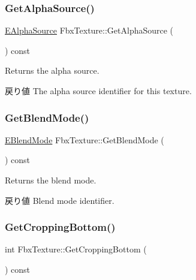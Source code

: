 \mbox{\label{class_fbx_texture_a6ca527821cb9e95af5376e7bb2979deb}} 
\subsubsection{\texorpdfstring{Get\+Alpha\+Source()}{GetAlphaSource()}}
{\footnotesize\ttfamily \hyperlink{class_fbx_texture_a12777ea406718d186e21b9656716171d}{E\+Alpha\+Source} Fbx\+Texture\+::\+Get\+Alpha\+Source (\begin{DoxyParamCaption}{ }\end{DoxyParamCaption}) const}

Returns the alpha source. \begin{DoxyReturn}{戻り値}
The alpha source identifier for this texture. 
\end{DoxyReturn}
\mbox{\label{class_fbx_texture_ad9f85f7fe1bb43f263f2edddeb9df443}} 
\subsubsection{\texorpdfstring{Get\+Blend\+Mode()}{GetBlendMode()}}
{\footnotesize\ttfamily \hyperlink{class_fbx_texture_af1e8597086589ba6b8ba0066d47b6b63}{E\+Blend\+Mode} Fbx\+Texture\+::\+Get\+Blend\+Mode (\begin{DoxyParamCaption}{ }\end{DoxyParamCaption}) const}

Returns the blend mode. \begin{DoxyReturn}{戻り値}
Blend mode identifier. 
\end{DoxyReturn}
\mbox{\label{class_fbx_texture_a12ee7e2132ce572b439b73de858f4f6c}} 
\subsubsection{\texorpdfstring{Get\+Cropping\+Bottom()}{GetCroppingBottom()}}
{\footnotesize\ttfamily int Fbx\+Texture\+::\+Get\+Cropping\+Bottom (\begin{DoxyParamCaption}{ }\end{DoxyParamCaption}) const}

